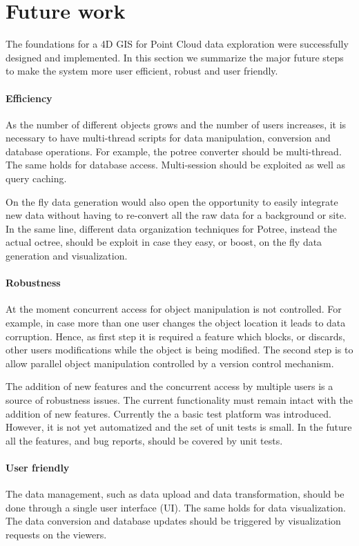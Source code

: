 \section{Future work}
\label{sec:future_work}
The foundations for a 4D GIS for Point Cloud data exploration were successfully
designed and implemented. In this section we summarize the major future steps
to make the system more user efficient, robust and user friendly.

\paragraph{Efficiency}
As the number of different objects grows and the number of users increases, it
is necessary to have multi-thread scripts for data manipulation, conversion and
database operations. For example, the potree converter should be multi-thread.
The same holds for database access. Multi-session should be exploited as well as
query caching. 

On the fly data generation would also open the opportunity to easily integrate
new data without having to re-convert all the raw data for a background or site.
In the same line, different data organization techniques for Potree, instead
the actual octree, should be exploit in case they easy, or boost, on the fly
data generation and visualization.

\paragraph{Robustness}
At the moment concurrent access for object manipulation is not controlled. For
example, in case more than one user changes the object location it leads to data
corruption. Hence, as first step it is required a feature which blocks, or discards,
other users modifications while the object is being modified. The second step is
to allow parallel object manipulation controlled by a version control mechanism.

The addition of new features and the concurrent access by multiple users is a
source of robustness issues. The current functionality must remain intact with
the addition of new features. Currently the a basic test platform was introduced.
However, it is not yet automatized and the set of unit tests is small. In the
future all the features, and bug reports, should be covered by unit tests.

\paragraph{User friendly}
The data management, such as data upload and data transformation, should be done through
a single user interface (UI). The same holds for data visualization. The data
conversion and database updates should be triggered by visualization requests
on the viewers.

